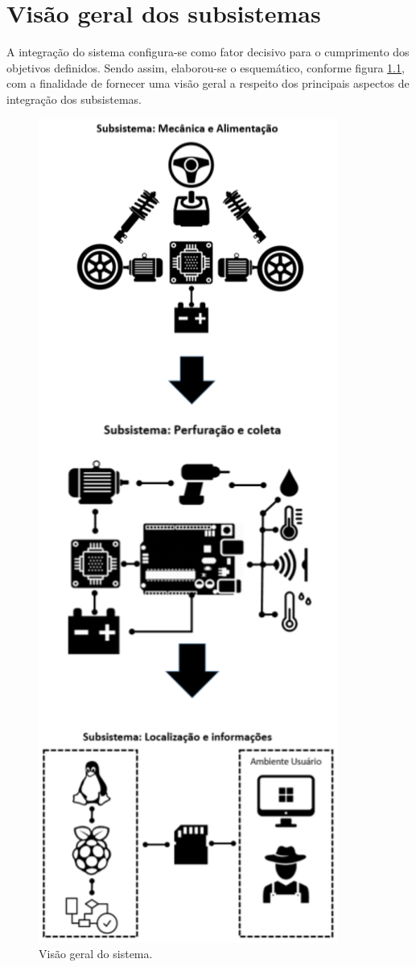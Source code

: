 \chapter{Visão geral dos subsistemas}

A integração do sistema configura-se como fator decisivo para o cumprimento dos objetivos definidos.
Sendo assim, elaborou-se o esquemático, conforme figura \ref{fig:visao_geral}, com a finalidade de fornecer uma visão geral a
respeito dos principais aspectos de integração dos subsistemas.

\begin{figure}[!htbp]
\begin{center}
\includegraphics[width=.6\textwidth]{figuras/all_systems.eps}
\caption{\label{fig:visao_geral}Visão geral do sistema.}
\end{center}
\end{figure}

